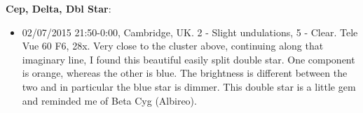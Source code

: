 {\bf Cep, Delta, Dbl Star}:
\begin{itemize}
\item 02/07/2015 21:50-0:00, Cambridge, UK. 2 - Slight undulations, 5 - Clear. Tele Vue 60 F6, 28x. Very close to the cluster above, continuing along that imaginary line, I found this beautiful easily split double star. One component is orange, whereas the other is blue. The brightness is different between the two and in particular the blue star is dimmer. This double star is a little gem and reminded me of Beta Cyg (Albireo).
\end{itemize}
